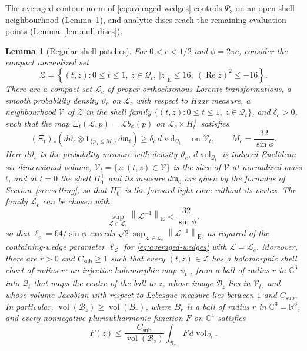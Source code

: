 \documentclass[11pt]{amsart}
\numberwithin{equation}{section}
\newtheorem{lemma}[theorem]{Lemma}
\theoremstyle{definition}
\newcommand{\R}{\mathbb R}
\newcommand{\C}{\mathbb C}
\newcommand{\sx}{\mathsf x}
\newcommand{\vol}{\operatorname{vol}}
\newcommand{\Rea}{\operatorname{Re}}
\newcommand{\norm}[1]{\left\|#1\right\|}
\begin{document}
The averaged contour norm of \eqref{eq:averaged-wedges} controls \(\Psi_\sx\) on an open shell
neighbourhood (Lemma~\ref{lem:regular-patches}), and analytic discs
reach the remaining evaluation points (Lemma~\ref{lem:null-discs}).

\begin{lemma}[Regular shell patches]\label{lem:regular-patches}
For \(0<c<1/2\) and \(\phi=2\pi c\), consider the compact normalized set
\begin{equation}
 \mathscr Z=
 \left\{(t,z):
 0\le t\le1,\ z\in\mathcal Q_t,\ |z|_{\mathrm E}\le16,\ 
 (\Rea z)^2\le-16\right\}.
 \label{eq:compact-target}
\end{equation}
There are a compact set \(\mathscr L_c\) of proper orthochronous
Lorentz transformations, a smooth probability density \(\vartheta_c\)
on \(\mathscr L_c\) with respect to Haar measure, a neighbourhood
\(\mathcal V\) of \(\mathscr Z\) in the shell family
\(\{(t,z):0\le t\le1,\ z\in\mathcal Q_t\}\), and \(\delta_c>0\), such
that the map \(\Xi_t(\mathcal L,p)=\mathcal Lb_\phi(p)\) on
\(\mathscr L_c\times H_t^+\) satisfies
\begin{equation}
 (\Xi_t)_*
 \left(d\vartheta_c\otimes
       \mathbf1_{\{p_0\le M_c\}}\,d\mathfrak m_t\right)
 \ge\delta_c\,d\vol_{\mathcal Q_t}
 \quad\text{on }\mathcal V_t,
 \qquad M_c=\frac{32}{\sin\phi}.
 \label{eq:pushforward}
\end{equation}
Here \(d\vartheta_c\) is the probability measure with density
\(\vartheta_c\), \(d\vol_{\mathcal Q_t}\) is induced Euclidean
six-dimensional volume, \(\mathcal V_t=\{z:(t,z)\in\mathcal V\}\) is the
slice of \(\mathcal V\) at normalized mass \(t\), and at \(t=0\) the
shell \(H_0^+\) and its measure \(d\mathfrak m_0\) are given by the
formulas of Section~\ref{sec:setting}, so that \(H_0^+\) is the forward
light cone without its vertex. The
family \(\mathscr L_c\) can be chosen with
\[
 \sup_{\mathcal L\in\mathscr L_c}
 \norm{\mathcal L^{-1}}_{\mathrm E}<\frac{32}{\sin\phi},
\]
so that \(\ell_c=64/{\sin\phi}\) exceeds
\(\sqrt2\sup_{\mathcal L\in\mathscr L_c}\norm{\mathcal L^{-1}}_{\mathrm E}\),
as required of the containing-wedge parameter \(\ell_{\mathscr L}\) for
\eqref{eq:averaged-wedges} with \(\mathscr L=\mathscr L_c\).
Moreover, there are \(r>0\) and \(C_{\mathrm{sub}}\ge1\) such that every
\((t,z)\in\mathscr Z\) has a holomorphic shell chart of radius \(r\): an
injective holomorphic map \(\psi_{t,z}\) from a ball of radius \(r\) in
\(\C^3\) into \(\mathcal Q_t\) that maps the centre of the ball to \(z\),
whose image \(\mathcal B_z\) lies in \(\mathcal V_t\), and whose volume
Jacobian with respect to Lebesgue measure lies between \(1\) and
\(C_{\mathrm{sub}}\). In particular, \(\vol(\mathcal B_z)\ge\vol(B_r)\),
where \(B_r\) is a ball of radius \(r\) in \(\C^3=\R^6\), and every
nonnegative plurisubharmonic function \(F\) on \(\C^4\) satisfies
\[
 F(z)\le\frac{C_{\mathrm{sub}}}{\vol(\mathcal B_z)}
 \int_{\mathcal B_z}F\,{d\vol_{\mathcal Q_t}}.
\]
\end{lemma}
\end{document}
